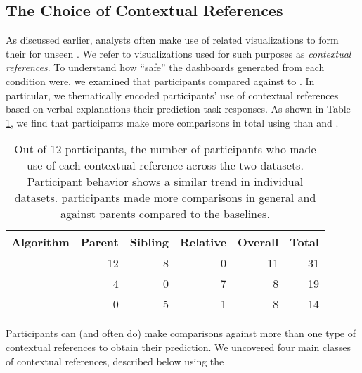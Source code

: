 \subsection{The Choice of Contextual References}
\par As discussed earlier,
analysts often make use of
related visualizations to
form their  for
unseen .
We refer to 
visualizations used
for such purposes as \emph{contextual references}.
To understand how ``safe'' the dashboards
generated from each condition were,
we examined 
that participants compared against
to .
In particular, we thematically encoded
participants' use of contextual references
based on  verbal explanations
 their prediction task responses.
As shown in Table \ref{table:contextualReferenceCount},
we find that participants make more comparisons in total using \system than \cluster and \BFS.
\begin{table}[h!]
\vspace{-5pt}
\centering
	\begin{tabular}{l|rrrr|r}
	 \small{Algorithm}   &    \small{Parent} &   \small{Sibling} &   \small{Relative} & \small{Overall} &   \small{Total} \\
	\hline
	 \small{\system}     &    \cellcolor{blue!25} 12 &       8 &     0 &  11 &      \cellcolor{blue!25} 31 \\
	 \small{\cluster}     &         4 &        0 &         7 &          8 &      19 \\
	 \small{\BFS}         &         0 &        5 &         1 &          8 &      14 \\
	\end{tabular}
\caption{Out of 12 participants, the number of participants who made use of each contextual reference across the two datasets. Participant behavior shows a similar trend in individual datasets. \system participants made more comparisons in general and against parents compared to the baselines.}
\label{table:contextualReferenceCount}
\vspace{-20pt}
\end{table}
\par Participants can (and often do) make comparisons against more than one type of contextual references to obtain their prediction. We uncovered four main classes of contextual references, described below using the
